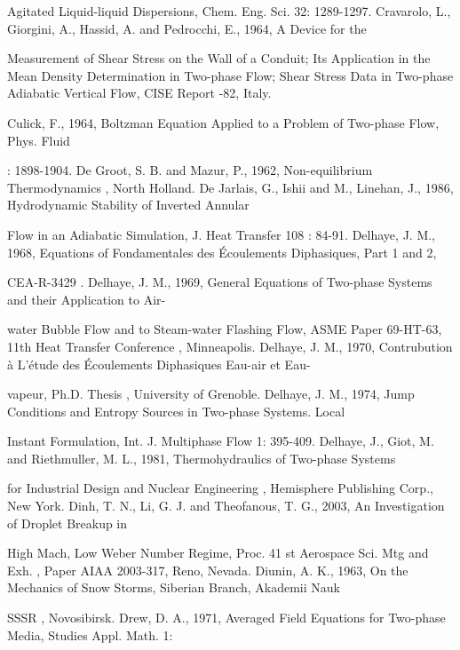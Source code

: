 \documentclass[11pt,a4paper,openany,fontset=none]{ctexbook}
\begin{document}
{\small\raggedright\noindent Agitated Liquid-liquid Dispersions, Chem. Eng. Sci. 32: 1289-1297. Cravarolo, L., Giorgini, A., Hassid, A. and Pedrocchi, E., 1964, A Device for the\par}
{\small\raggedright\noindent Measurement of Shear Stress on the Wall of a Conduit; Its Application in the Mean Density Determination in Two-phase Flow; Shear Stress Data in Two-phase Adiabatic Vertical Flow, CISE Report -82, Italy.\par}
{\small\raggedright\noindent Culick, F., 1964, Boltzman Equation Applied to a Problem of Two-phase Flow, Phys. Fluid\par}
{\small\raggedright{}: 1898-1904. De Groot, S. B. and Mazur, P., 1962, Non-equilibrium Thermodynamics , North Holland. De Jarlais, G., Ishii and M., Linehan, J., 1986, Hydrodynamic Stability of Inverted Annular\par}
{\small\raggedright\noindent Flow in an Adiabatic Simulation, J. Heat Transfer 108 : 84-91. Delhaye, J. M., 1968, Equations of Fondamentales des Écoulements Diphasiques, Part 1 and 2,\par}
{\small\raggedright\noindent CEA-R-3429 . Delhaye, J. M., 1969, General Equations of Two-phase Systems and their Application to Air-\par}
{\small\raggedright\noindent water Bubble Flow and to Steam-water Flashing Flow, ASME Paper 69-HT-63, 11th Heat Transfer Conference , Minneapolis. Delhaye, J. M., 1970, Contrubution à L’étude des Écoulements Diphasiques Eau-air et Eau-\par}
{\small\raggedright\noindent vapeur, Ph.D. Thesis , University of Grenoble. Delhaye, J. M., 1974, Jump Conditions and Entropy Sources in Two-phase Systems. Local\par}
{\small\raggedright\noindent Instant Formulation, Int. J. Multiphase Flow 1: 395-409. Delhaye, J., Giot, M. and Riethmuller, M. L., 1981, Thermohydraulics of Two-phase Systems\par}
{\small\raggedright\noindent for Industrial Design and Nuclear Engineering , Hemisphere Publishing Corp., New York. Dinh, T. N., Li, G. J. and Theofanous, T. G., 2003, An Investigation of Droplet Breakup in\par}
{\small\raggedright\noindent High Mach, Low Weber Number Regime, Proc. 41 st Aerospace Sci. Mtg and Exh. , Paper AIAA 2003-317, Reno, Nevada. Diunin, A. K., 1963, On the Mechanics of Snow Storms, Siberian Branch, Akademii Nauk\par}
{\small\raggedright\noindent SSSR , Novosibirsk. Drew, D. A., 1971, Averaged Field Equations for Two-phase Media, Studies Appl. Math. 1:\par}
\end{document}
